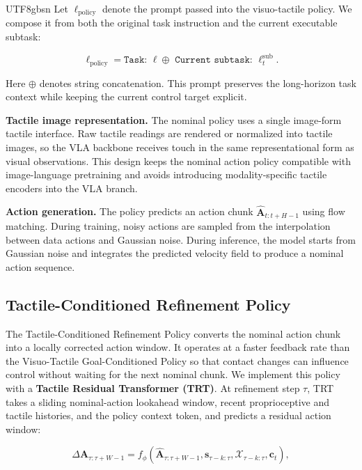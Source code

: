 \documentclass[]{mpai_report}
\begin{document}
\begin{CJK*}{UTF8}{gbsn}
Let $\ell_{\mathrm{policy}}$ denote the prompt passed into the visuo-tactile policy.
We compose it from both the original task instruction and the current executable subtask:

\begin{equation}
    \ell_{\mathrm{policy}} =
    \texttt{Task: } \ell
    \oplus
    \texttt{ Current subtask: } \ell_t^{\mathrm{sub}}.
\end{equation}

Here $\oplus$ denotes string concatenation.
This prompt preserves the long-horizon task context while keeping the current control target explicit.

\noindent\textbf{Tactile image representation.}
The nominal policy uses a single image-form tactile interface.
Raw tactile readings are rendered or normalized into tactile images, so the VLA backbone receives touch in the same representational form as visual observations.
This design keeps the nominal action policy compatible with image-language pretraining and avoids introducing modality-specific tactile encoders into the VLA branch.

\noindent\textbf{Action generation.}
The policy predicts an action chunk $\hat{\mathbf{A}}_{t:t+H-1}$ using flow matching.
During training, noisy actions are sampled from the interpolation between data actions and Gaussian noise.
During inference, the model starts from Gaussian noise and integrates the predicted velocity field to produce a nominal action sequence.

\subsection{Tactile-Conditioned Refinement Policy}
\label{sec:tactile_refinement_policy}

The Tactile-Conditioned Refinement Policy converts the nominal action chunk into a locally corrected action window.
It operates at a faster feedback rate than the Visuo-Tactile Goal-Conditioned Policy so that contact changes can influence control without waiting for the next nominal chunk.
We implement this policy with a \textbf{Tactile Residual Transformer (TRT)}.
At refinement step $\tau$, TRT takes a sliding nominal-action lookahead window, recent proprioceptive and tactile histories, and the policy context token, and predicts a residual action window:

\begin{equation}
    \Delta \mathbf{A}_{\tau:\tau+W-1} =
    f_{\phi}(\hat{\mathbf{A}}_{\tau:\tau+W-1}, \mathbf{s}_{\tau-k:\tau}, \mathcal{X}_{\tau-k:\tau}, \mathbf{c}_t),
\end{equation}


\end{CJK*}
\end{document}
